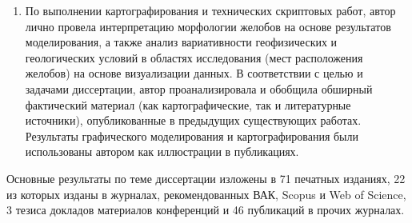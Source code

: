 \begin{enumerate}[label=\emph{\Alph*})]
	\item По выполнении картографирования и технических скриптовых работ, автор лично провела интерпретацию морфологии желобов на основе результатов моделирования, а также анализ вариативности геофизических и геологических условий в областях исследования (мест расположения желобов) на основе визуализации данных. В соответствии с целью и задачами диссертации, автор проанализировала и обобщила обширный фактический материал (как картографические, так и литературные источники), опубликованные в предыдущих существующих работах. Результаты графического моделирования и картографирования были использованы автором как иллюстрации в публикациях. 
\end{enumerate}

{%
    {\publications} Основные результаты по теме диссертации изложены
    в 71 печатных изданиях,  22 из которых изданы в журналах, рекомендованных ВАК, Scopus и Web of Science,
    3 тезиса докладов материалов конференций и 46 публикаций в прочих журналах.
}%

